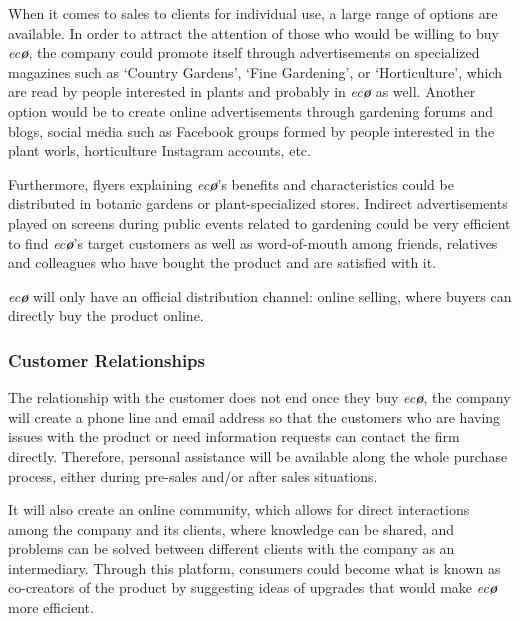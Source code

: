 \documentclass[english,runningheads,a4paper]{llncs}[2018/03/10]
\begin{document}
        When it comes to sales to clients for individual use, a large range of
        options are available. In order to attract the attention of those who
        would be willing to buy \textit{ec\textbf{\o}}, the company could
        promote itself through advertisements on specialized magazines such as
        `Country Gardens', `Fine Gardening', or `Horticulture', which are read
        by people interested in plants and probably in \textit{ec\textbf{\o}} as
        well. Another option would be to create online advertisements through
        gardening forums and blogs, social media such as Facebook groups formed
        by people interested in the plant worls, horticulture Instagram
        accounts, etc.

        Furthermore, flyers explaining \textit{ec\textbf{\o}}'s benefits and
        characteristics could be distributed in botanic gardens or
        plant-specialized stores. Indirect advertisements played on screens
        during public events related to gardening could be very efficient to
        find \textit{ec\textbf{\o}}'s target customers as well as word-of-mouth
        among friends, relatives and colleagues who have bought the product and
        are satisfied with it.

        \textit{ec\textbf{\o}} will only have an official distribution channel:
        online selling, where buyers can directly buy the product online.


        \subsubsection*{Customer Relationships}

        The relationship with the customer does not end once they buy
        \textit{ec\textbf{\o}}, the company will create a phone line and email
        address so that the customers who are having issues with the product or
        need information requests can contact the firm directly. Therefore,
        personal assistance will be available along the whole purchase process,
        either during pre-sales and/or after sales situations.

        It will also create an online community, which allows for direct
        interactions among the company and its clients, where knowledge can be
        shared, and problems can be solved between different clients with the
        company as an intermediary. Through this platform, consumers could
        become what is known as co-creators of the product by suggesting ideas
        of upgrades that would make \textit{ec\textbf{\o}} more efficient.
\end{document}
